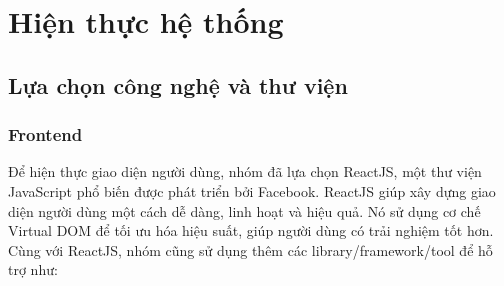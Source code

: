 \chapter{Hiện thực hệ thống}
\section{Lựa chọn công nghệ và thư viện}
\subsection{Frontend}
\noindent Để hiện thực giao diện người dùng, nhóm đã lựa chọn ReactJS, một thư viện JavaScript phổ biến được phát triển bởi Facebook. ReactJS giúp xây dựng giao diện người dùng một cách dễ dàng, linh hoạt và hiệu quả. Nó sử dụng cơ chế Virtual DOM để tối ưu hóa hiệu suất, giúp người dùng có trải nghiệm tốt hơn.\\[0.5cm]
Cùng với ReactJS, nhóm cũng sử dụng thêm các library/framework/tool để hỗ trợ như:
